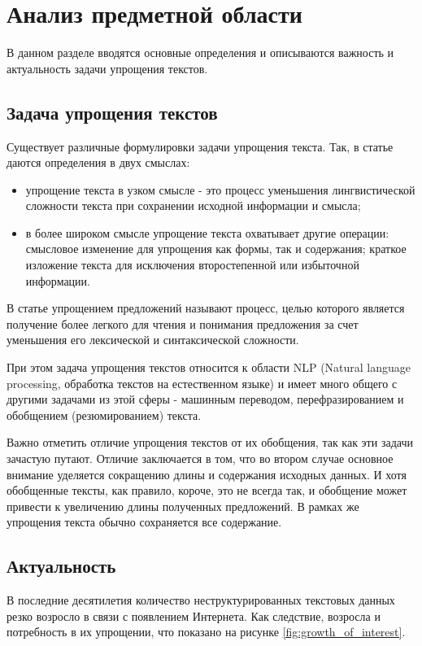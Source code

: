 \chapter{Анализ предметной области}

В данном разделе вводятся основные определения и описываются важность и актуальность задачи упрощения текстов.

\section{Задача упрощения текстов}


Существует различные формулировки задачи упрощения текста. 
Так, в статье \cite{siddharthan_survey_2014} даются определения в двух смыслах:
\begin{itemize}
	\item упрощение текста в узком смысле - это процесс уменьшения лингвистической сложности текста при сохранении исходной информации и смысла;
	\item в более широком смысле упрощение текста охватывает другие операции: смысловое изменение для упрощения как формы, так и содержания; краткое изложение текста для исключения второстепенной или избыточной информации.
\end{itemize}


В статье \cite{martin_muss_2021} упрощением предложений называют процесс, целью которого является получение более легкого для чтения и понимания предложения за счет уменьшения его лексической и синтаксической сложности.

При этом задача упрощения текстов относится к области NLP (Natural language processing, обработка текстов на естественном языке) и имеет много общего с другими задачами из этой сферы - машинным переводом, перефразированием и обобщением (резюмированием) текста\cite{zhu_monolingual_2010}. 

Важно отметить отличие упрощения текстов от их обобщения, так как эти задачи зачастую путают. Отличие заключается в том, что во втором случае основное внимание уделяется сокращению длины и содержания исходных данных. И хотя обобщенные тексты, как правило, короче, это не всегда так, и обобщение может привести к увеличению длины полученных предложений\cite{shardlow_survey_2014}. В рамках же упрощения текста обычно сохраняется все содержание.

\section{Актуальность}
В последние десятилетия количество неструктурированных текстовых данных резко возросло в связи с появлением Интернета. Как следствие, возросла и потребность в их упрощении, что показано на рисунке \ref{fig:growth_of_interest}. 


